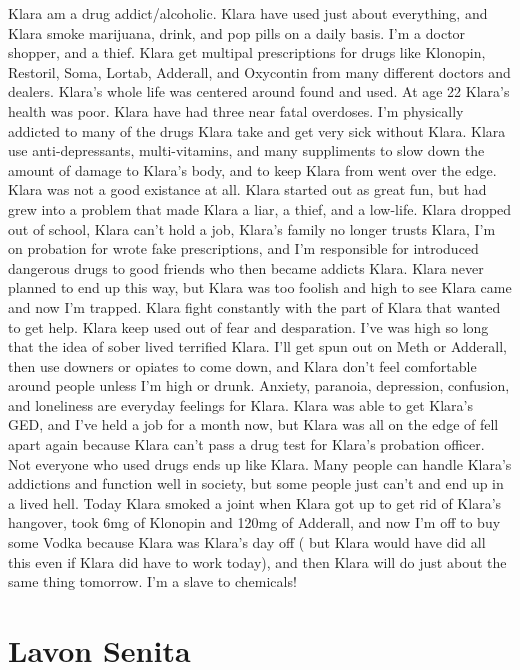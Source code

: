\documentclass[12pt]{book}
\begin{document}
Klara am a drug addict/alcoholic. Klara have used just about everything, and Klara smoke marijuana, drink, and pop pills on a daily basis. I'm a doctor shopper, and a thief. Klara get multipal prescriptions for drugs like Klonopin, Restoril, Soma, Lortab, Adderall, and Oxycontin from many different doctors and dealers. Klara's whole life was centered around found and used. At age 22 Klara's health was poor. Klara have had three near fatal overdoses. I'm physically addicted to many of the drugs Klara take and get very sick without Klara. Klara use anti-depressants, multi-vitamins, and many suppliments to slow down the amount of damage to Klara's body, and to keep Klara from went over the edge. Klara was not a good existance at all. Klara started out as great fun, but had grew into a problem that made Klara a liar, a thief, and a low-life. Klara dropped out of school, Klara can't hold a job, Klara's family no longer trusts Klara, I'm on probation for wrote fake prescriptions, and I'm responsible for introduced dangerous drugs to good friends who then became addicts Klara. Klara never planned to end up this way, but Klara was too foolish and high to see Klara came and now I'm trapped. Klara fight constantly with the part of Klara that wanted to get help. Klara keep used out of fear and desparation. I've was high so long that the idea of sober lived terrified Klara. I'll get spun out on Meth or Adderall, then use downers or opiates to come down, and Klara don't feel comfortable around people unless I'm high or drunk. Anxiety, paranoia, depression, confusion, and loneliness are everyday feelings for Klara. Klara was able to get Klara's GED, and I've held a job for a month now, but Klara was all on the edge of fell apart again because Klara can't pass a drug test for Klara's probation officer. Not everyone who used drugs ends up like Klara. Many people can handle Klara's addictions and function well in society, but some people just can't and end up in a lived hell. Today Klara smoked a joint when Klara got up to get rid of Klara's hangover, took 6mg of Klonopin and 120mg of Adderall, and now I'm off to buy some Vodka because Klara was Klara's day off ( but Klara would have did all this even if Klara did have to work today), and then Klara will do just about the same thing tomorrow. I'm a slave to chemicals!



\chapter{Lavon Senita}
\end{document}
